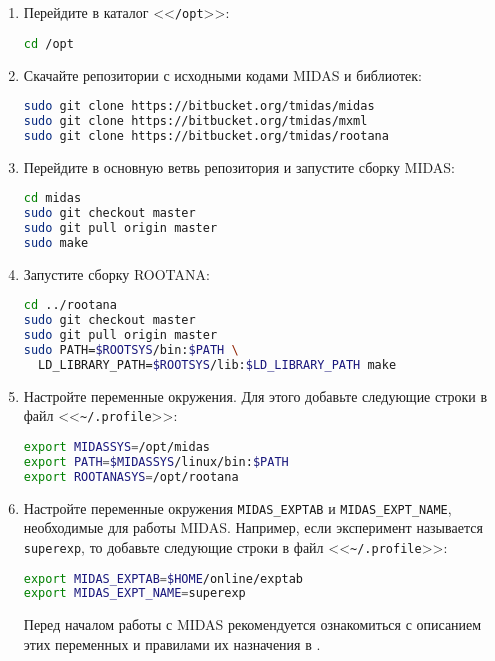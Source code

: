 \documentclass[12pt, a4paper, oneside, onecolumn]{book}
\newcommand{\MIDAS}{\mbox{MIDAS}}
\newcommand{\ROOTANA}{\mbox{ROOTANA}}
\newcommand{\DIRECTORY}[1]{<<{\tt #1}>>}
\newcommand{\FILE}[1]{<<{\tt #1}>>}
\newcommand{\ENV}[1]{{\tt #1}}
\begin{document}
\begin{enumerate}
\item Перейдите в каталог \DIRECTORY{/opt}:

\begin{lstlisting}[language=bash]
cd /opt
\end{lstlisting}

\item Скачайте репозитории с исходными кодами \MIDAS{} и библиотек:

\begin{lstlisting}[language=bash]
sudo git clone https://bitbucket.org/tmidas/midas
sudo git clone https://bitbucket.org/tmidas/mxml
sudo git clone https://bitbucket.org/tmidas/rootana
\end{lstlisting}

\item Перейдите в основную ветвь репозитория и запустите сборку \MIDAS{}:

\begin{lstlisting}[language=bash]
cd midas
sudo git checkout master
sudo git pull origin master
sudo make
\end{lstlisting}

\item Запустите сборку \ROOTANA{}:

\begin{lstlisting}[language=bash]
cd ../rootana
sudo git checkout master
sudo git pull origin master
sudo PATH=$ROOTSYS/bin:$PATH \
  LD_LIBRARY_PATH=$ROOTSYS/lib:$LD_LIBRARY_PATH make
\end{lstlisting}

\item Настройте переменные окружения. Для этого добавьте следующие строки в файл \FILE{\~{}/.profile}:

\begin{lstlisting}[language=bash]
export MIDASSYS=/opt/midas
export PATH=$MIDASSYS/linux/bin:$PATH
export ROOTANASYS=/opt/rootana
\end{lstlisting}

\item Настройте переменные окружения \ENV{MIDAS\_EXPTAB} и \ENV{MIDAS\_EXPT\_NAME}, необходимые для работы \MIDAS{}. Например, если эксперимент называется {\tt superexp}, то добавьте следующие строки в файл \FILE{\~{}/.profile}:

\begin{lstlisting}[language=bash]
export MIDAS_EXPTAB=$HOME/online/exptab
export MIDAS_EXPT_NAME=superexp
\end{lstlisting}

Перед началом работы с \MIDAS{} рекомендуется ознакомиться с описанием этих переменных и правилами их назначения в \cite{MidasWikiInstall}.

\end{enumerate}
\end{document}
